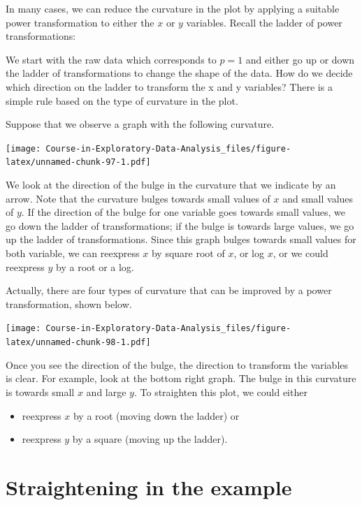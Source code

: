 \documentclass[
]{book}
\providecommand{\tightlist}{%
  \setlength{\itemsep}{0pt}\setlength{\parskip}{0pt}}
\begin{document}
In many cases, we can reduce the curvature in the plot by applying a suitable power transformation to either the \(x\) or \(y\) variables. Recall the ladder of power transformations:

We start with the raw data which corresponds to \(p = 1\) and either go up or down the ladder of transformations to change the shape of the data. How do we decide which direction on the ladder to transform the x and y variables? There is a simple rule based on the type of curvature in the plot.

Suppose that we observe a graph with the following curvature.

\texttt{[image: Course-in-Exploratory-Data-Analysis\_files/figure-latex/unnamed-chunk-97-1.pdf]}

We look at the direction of the bulge in the curvature that we indicate by an arrow. Note that the curvature bulges towards small values of \(x\) and small values of \(y\). If the direction of the bulge for one variable goes towards small values, we go down the ladder of transformations; if the bulge is towards large values, we go up the ladder of transformations. Since this graph bulges towards small values for both variable, we can reexpress \(x\) by square root of \(x\), or log \(x\), or we could reexpress \(y\) by a root or a log.

Actually, there are four types of curvature that can be improved by a power transformation, shown below.

\texttt{[image: Course-in-Exploratory-Data-Analysis\_files/figure-latex/unnamed-chunk-98-1.pdf]}

Once you see the direction of the bulge, the direction to transform the variables is clear. For example, look at the bottom right graph. The bulge in this curvature is towards small \(x\) and large \(y\). To straighten this plot, we could either

\begin{itemize}
\tightlist
\item
  reexpress \(x\) by a root (moving down the ladder) or
\item
  reexpress \(y\) by a square (moving up the ladder).
\end{itemize}

\hypertarget{straightening-in-the-example}{%
\section{Straightening in the example}\label{straightening-in-the-example}}
\end{document}
